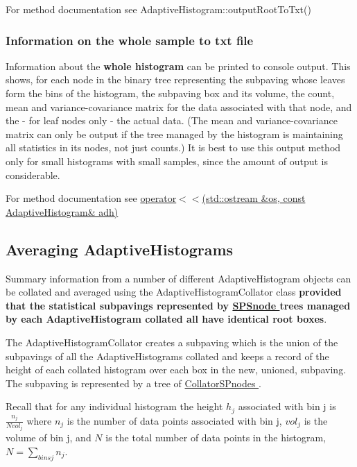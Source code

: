 \-For method documentation see \-Adaptive\-Histogram\-::output\-Root\-To\-Txt()\hypertarget{AdaptiveHistograms_adhsubsec_outputroot}{}\subsubsection{\-Information on the whole sample to txt file}\label{AdaptiveHistograms_adhsubsec_outputroot}
\-Information about the {\bfseries  whole histogram } can be printed to console output. \-This shows, for each node in the binary tree representing the subpaving whose leaves form the bins of the histogram, the subpaving box and its volume, the count, mean and variance-\/covariance matrix for the data associated with that node, and the -\/ for leaf nodes only -\/ the actual data. (\-The mean and variance-\/covariance matrix can only be output if the tree managed by the histogram is maintaining all statistics in its nodes, not just counts.) \-It is best to use this output method only for small histograms with small samples, since the amount of output is considerable.

\-For method documentation see \hyperlink{adaptivehistogram_8cpp_a4b985816e4b7856ce15449885e012e09}{operator$<$$<$(std\-::ostream \&os, const Adaptive\-Histogram\& adh)}



\hypertarget{AdaptiveHistograms_adhsec_averaging}{}\subsection{\-Averaging Adaptive\-Histograms}\label{AdaptiveHistograms_adhsec_averaging}
\-Summary information from a number of different \-Adaptive\-Histogram objects can be collated and averaged using the \-Adaptive\-Histogram\-Collator class {\bfseries  provided that the statistical subpavings represented by \hyperlink{classsubpavings_1_1SPSnode}{\-S\-P\-Snode } trees managed by each \-Adaptive\-Histogram collated all have identical root boxes}.

\-The \-Adaptive\-Histogram\-Collator creates a subpaving which is the union of the subpavings of all the \-Adaptive\-Histograms collated and keeps a record of the height of each collated histogram over each box in the new, unioned, subpaving. \-The subpaving is represented by a tree of \hyperlink{classsubpavings_1_1CollatorSPnode}{\-Collator\-S\-Pnodes }.

\-Recall that for any individual histogram the height $ h_j $ associated with bin j is $ \frac{n_j}{Nvol_j} $ where $ n_j $ is the number of data points associated with bin j, $ vol_j $ is the volume of bin j, and $ N $ is the total number of data points in the histogram, $ N = \sum_{bins j} n_j $.

